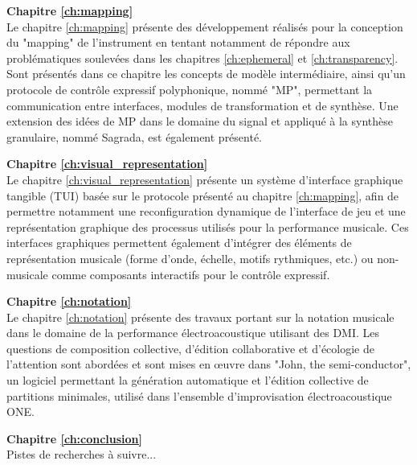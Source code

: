 \textbf{Chapitre \ref{ch:mapping}} \\[0.2em]
Le chapitre \ref{ch:mapping} présente des développement réalisés pour la conception du "mapping" de l'instrument en tentant notamment de répondre aux problématiques soulevées dans les chapitres \ref{ch:ephemeral} et \ref{ch:transparency}. Sont présentés dans ce chapitre les concepts de modèle intermédiaire, ainsi qu'un protocole de contrôle expressif polyphonique, nommé "MP", permettant la communication entre interfaces, modules de transformation et de synthèse. Une extension des idées de MP dans le domaine du signal et appliqué à la synthèse granulaire, nommé Sagrada, est également présenté.

\textbf{Chapitre \ref{ch:visual_representation}} \\[0.2em]
Le chapitre \ref{ch:visual_representation} présente un système d'interface graphique tangible (TUI) basée sur le protocole présenté au chapitre  \ref{ch:mapping}, afin de permettre notamment une reconfiguration dynamique de l'interface de jeu et une représentation graphique des processus utilisés pour la performance musicale. Ces interfaces graphiques permettent également d'intégrer des éléments de représentation musicale (forme d'onde, échelle, motifs rythmiques, etc.) ou non-musicale comme composants interactifs pour le contrôle expressif.

\textbf{Chapitre \ref{ch:notation}} \\[0.2em]
Le chapitre \ref{ch:notation} présente des travaux portant sur la notation musicale dans le domaine de la performance électroacoustique utilisant des DMI. Les questions de composition collective, d'édition collaborative et d'écologie de l'attention sont abordées et sont mises en œuvre dans "John, the semi-conductor", un logiciel permettant la génération automatique et l'édition collective de partitions minimales, utilisé dans l'ensemble d'improvisation électroacoustique ONE. 

\textbf{Chapitre \ref{ch:conclusion}} \\[0.2em]
Pistes de recherches à suivre...